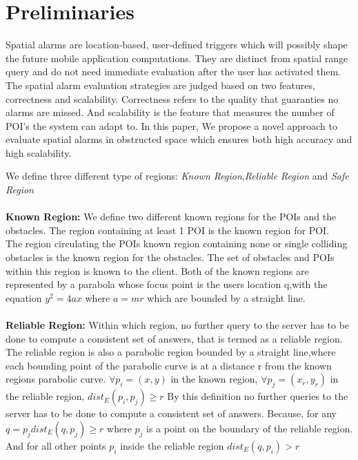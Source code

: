 \section{Preliminaries}
Spatial alarms are location-based, user-defined triggers which will possibly shape the future mobile application computations. They are distinct from spatial range query and do not need immediate evaluation after the user has activated them. The spatial alarm evaluation strategies are judged based on two features, correctness and scalability. Correctness refers to the quality that guaranties no alarms are missed. And scalability is the feature that measures the number of POI's the system can adapt to. 
In this paper, We propose a novel approach to evaluate spatial alarms in obstructed space which ensures both high accuracy and high scalability.

We define three different type of regions: \textit{Known Region},\textit{Reliable Region} and \textit{Safe Region}\\ \\

\textbf{Known Region:} We define two different known regions for the POIs and the obstacles. The region containing at least 1 POI is the known region for POI.\\
The region circulating the POIs known region containing none or single colliding obstacles is the known region for the obstacles. The set of obstacles and POIs within this region is known to the client. 
Both of the known regions are represented by a parabola whose focus point is the users location q,with the equation $y^2=4ax$ where $a=mr$ which are bounded by a straight line. \\ \\


\textbf{Reliable Region:} Within which region, no further query to the server has to be done to compute a consistent set of answers, that is termed as a reliable region. The reliable region is also a parabolic region bounded by a straight line,where each bounding point of the parabolic curve is at a distance r from the known regions parabolic curve. $ \forall p_i=(x,y) $ in the known region, $ \forall p_j=(x_r,y_r) $ in the reliable region, $ dist_E(p_i,p_j)\geq r $ By this definition no further queries to the server has to be done to compute a consistent set of answers. Because, for any $q =p_j dist_E(q,p_j) \geq r$ where $p_j$ is a point on the boundary of the reliable region. And for all other points $ p_i $ inside the reliable region $  dist_E(q,p_i)>r$ \\ \\


